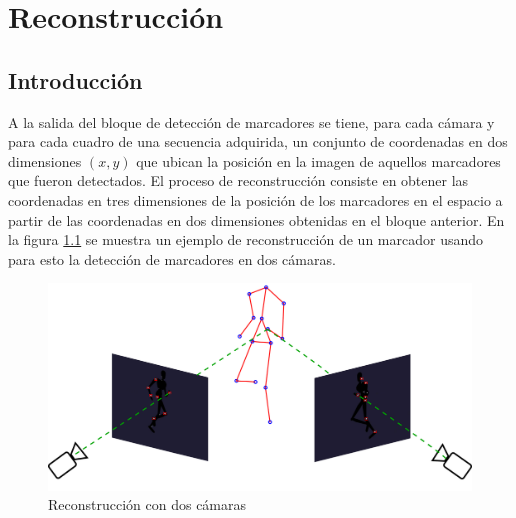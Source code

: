 


\chapter{Reconstrucción}
\section{Introducción}
A la salida del bloque de detección de marcadores se tiene, para cada cámara y para cada cuadro de una secuencia adquirida, un conjunto de coordenadas en dos dimensiones $(x,y)$ que ubican la posición en la imagen de aquellos marcadores que fueron detectados.
El proceso de reconstrucción consiste en obtener las coordenadas en tres dimensiones de la posición de los marcadores en el espacio a partir de las coordenadas en dos dimensiones obtenidas en el bloque anterior.
En la figura \ref{fig: esquema_reconstruccion} se muestra un ejemplo de reconstrucción de un marcador usando para esto la detección de marcadores en dos cámaras.\\

\begin{figure}[!ht]
\begin{center}
\includegraphics[scale=0.20]{img/Reconstruccion/reconstruccion}

\end{center}
\caption{Reconstrucción con dos cámaras}
\label{fig: esquema_reconstruccion}
\end{figure}

